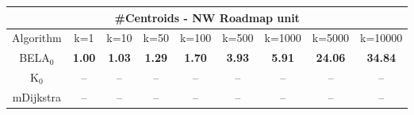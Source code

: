 \begin{tabular}{c|cccccccc}\toprule
\multicolumn{9}{c}{#Centroids - NW Roadmap unit}\\ \midrule
Algorithm & k=1 & k=10 & k=50 & k=100 & k=500 & k=1000 & k=5000 & k=10000 \\ \midrule
BELA$_0$ & \textbf{1.00} & \textbf{1.03} & \textbf{1.29} & \textbf{1.70} & \textbf{3.93} & \textbf{5.91} & \textbf{24.06} & \textbf{34.84} \\
K$_0$ & -- & -- & -- & -- & -- & -- & -- & -- \\
mDijkstra & -- & -- & -- & -- & -- & -- & -- & -- \\ \bottomrule 
\end{tabular}
